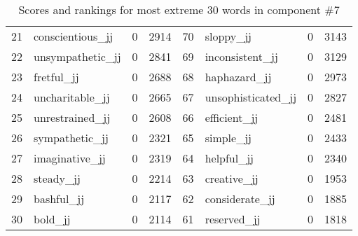 \begin{table}[tbp]
\begin{tabular}{| rlr@{.}l | rlr@{.}l |}
    21 & conscientious\_jj & 0 & 2914    &    70 & sloppy\_jj & 0 & 3143 \\
    22 & unsympathetic\_jj & 0 & 2841    &    69 & inconsistent\_jj & 0 & 3129 \\
    23 & fretful\_jj & 0 & 2688    &    68 & haphazard\_jj & 0 & 2973 \\
    24 & uncharitable\_jj & 0 & 2665    &    67 & unsophisticated\_jj & 0 & 2827 \\
    25 & unrestrained\_jj & 0 & 2608    &    66 & efficient\_jj & 0 & 2481 \\
    26 & sympathetic\_jj & 0 & 2321    &    65 & simple\_jj & 0 & 2433 \\
    27 & imaginative\_jj & 0 & 2319    &    64 & helpful\_jj & 0 & 2340 \\
    28 & steady\_jj & 0 & 2214    &    63 & creative\_jj & 0 & 1953 \\
    29 & bashful\_jj & 0 & 2117    &    62 & considerate\_jj & 0 & 1885 \\
    30 & bold\_jj & 0 & 2114    &    61 & reserved\_jj & 0 & 1818 \\
    \hline
    \end{tabular}
    \caption{Scores and rankings for most extreme 30 words in component \#7} 
\end{table}
\clearpage
